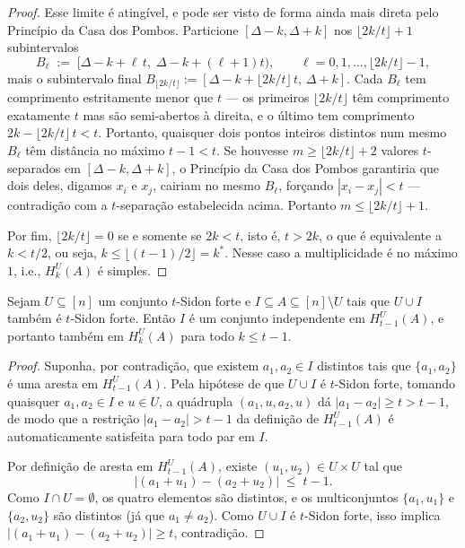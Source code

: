\documentclass[reqno,a4paper,12pt]{amsart}
\begin{document}
\begin{proof}
  Esse limite é atingível, e pode ser visto de forma ainda mais direta pelo Princípio da
  Casa dos Pombos. Particione $[\Delta-k, \Delta+k]$ nos $\lfloor 2k/t \rfloor + 1$
  subintervalos
  \[
    B_\ell \;:=\; \bigl[\Delta - k + \ell\,t,\; \Delta - k + (\ell+1)t\bigr),
    \qquad \ell = 0, 1, \ldots, \lfloor 2k/t \rfloor - 1,
  \]
  mais o subintervalo final $B_{\lfloor 2k/t \rfloor} := [\Delta - k + \lfloor 2k/t \rfloor\,t,\,
    \Delta + k]$. Cada $B_\ell$ tem comprimento estritamente menor que $t$ — os primeiros
  $\lfloor 2k/t\rfloor$ têm comprimento exatamente $t$ mas são semi-abertos à direita, e o
  último tem comprimento $2k - \lfloor 2k/t\rfloor\,t < t$. Portanto, quaisquer dois pontos
  inteiros distintos num mesmo $B_\ell$ têm distância no máximo $t-1 < t$. Se houvesse
  $m \geq \lfloor 2k/t \rfloor + 2$ valores $t$-separados em $[\Delta-k,\Delta+k]$, o
  Princípio da Casa dos Pombos garantiria que dois deles, digamos $x_i$ e $x_j$, cairiam no
  mesmo $B_\ell$, forçando $|x_i - x_j| < t$ — contradição com a $t$-separação estabelecida
  acima. Portanto $m \leq \lfloor 2k/t \rfloor + 1$.

  Por fim, $\lfloor 2k/t \rfloor = 0$ se e somente se $2k < t$, isto é, $t > 2k$, o que é
  equivalente a $k < t/2$, ou seja, $k \leq \lfloor (t-1)/2 \rfloor = k^*$. Nesse caso a
  multiplicidade é no máximo $1$, i.e., $H_k^U(A)$ é simples.
\end{proof}


\begin{proposition}\label{prop:independente}
  Sejam $U \subseteq [n]$ um conjunto $t$-Sidon forte e $I \subseteq A \subseteq [n] \setminus U$
  tais que $U \cup I$ também é $t$-Sidon forte. Então $I$ é um conjunto independente em
  $H_{t-1}^U(A)$, e portanto também em $H_k^U(A)$ para todo $k \leq t-1$.
\end{proposition}

\begin{proof}
  Suponha, por contradição, que existem $a_1, a_2 \in I$ distintos tais que $\{a_1,a_2\}$ é
  uma aresta em $H_{t-1}^U(A)$. Pela hipótese de que $U \cup I$ é $t$-Sidon forte, tomando
  quaisquer $a_1, a_2 \in I$ e $u \in U$, a quádrupla $(a_1, u, a_2, u)$ dá
  $|a_1 - a_2| \geq t > t-1$, de modo que a restrição $|a_1-a_2|>t-1$ da definição
  de $H_{t-1}^U(A)$ é automaticamente satisfeita para todo par em $I$.

  Por definição de aresta em $H_{t-1}^U(A)$, existe $(u_1, u_2) \in U \times U$ tal que
  \[
    |(a_1+u_1)-(a_2+u_2)| \;\leq\; t-1.
  \]
  Como $I \cap U = \emptyset$, os quatro elementos são distintos, e os multiconjuntos
  $\{a_1, u_1\}$ e $\{a_2, u_2\}$ são distintos (já que $a_1 \neq a_2$). Como $U \cup I$
  é $t$-Sidon forte, isso implica $|(a_1+u_1)-(a_2+u_2)| \geq t$, contradição.
\end{proof}
\end{document}
